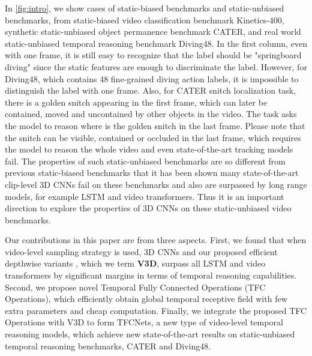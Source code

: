 \documentclass[nohyperref]{article}
\theoremstyle{plain}
\theoremstyle{definition}
\theoremstyle{remark}
\begin{document}
In \cref{fig:intro}, we show cases of static-biased benchmarks and static-unbiased benchmarks, from static-biased video classification benchmark Kinetics-400\cite{DBLP:conf/cvpr/CarreiraZ17}, synthetic static-unbiased object permanence benchmark CATER\cite{Girdhar2020CATER:}, and real world static-unbiased temporal reasoning benchmark Diving48\cite{Li_2018_ECCV}. In the first column, even with one frame, it is still easy to recognize that the label should be "springboard diving" since the static features are enough to discriminate the label. However, for Diving48, which contains 48 fine-grained diving action labels, it is impossible to distinguish the label with one frame. Also, for CATER snitch localization task, there is a golden snitch appearing in the first frame, which can later be contained, moved and uncontained by other objects in the video. The task asks the model to reason where is the golden snitch in the last frame. Please note that the snitch can be visible, contained or occluded in the last frame, which requires the model to reason the whole video and even state-of-the-art tracking models fail\cite{Girdhar2020CATER:}. The properties of such static-unbiased benchmarks\cite{Girdhar2020CATER:,Li_2018_ECCV} are so different from previous static-biased benchmarks\cite{DBLP:conf/cvpr/CarreiraZ17,DBLP:journals/corr/abs-1212-0402} that it has been shown many state-of-the-art clip-level 3D CNNs\cite{DBLP:journals/corr/abs-1812-03982} fail on these benchmarks\cite{Girdhar2020CATER:,zhou2021hopper} and also are surpassed by long range models, for example LSTM\cite{Hochreiter1997LongSM} and video transformers\cite{bertasius2021spacetime}. Thus it is an important direction to explore the properties of 3D CNNs on these static-unbiased video benchmarks.



 Our contributions  in this paper are from three aspects. First, we found that when video-level sampling strategy is used, 3D CNNs and our proposed efficient depthwise variants , which we term {\bf V3D}, surpass all LSTM and video transformers by significant margins in terms of temporal reasoning capabilities. Second, we propose novel Temporal Fully Connected Operations (TFC Operations), which efficiently obtain global temporal receptive field with few extra parameters and cheap computation. Finally, we integrate the proposed TFC Operations with V3D to form TFCNets, a new type of  video-level temporal reasoning models, which achieve new state-of-the-art results on static-unbiased temporal reasoning benchmarks, CATER and Diving48.
\end{document}
